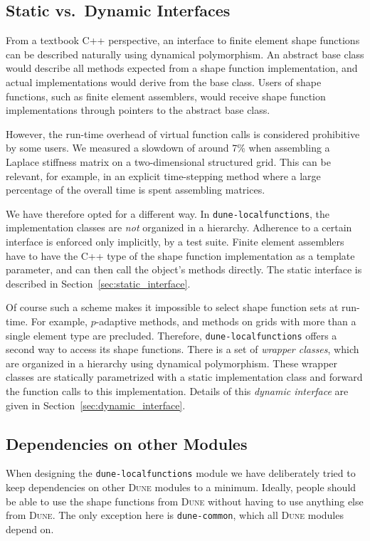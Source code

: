 \documentclass[11pt]{article}
\newcommand{\dune}{\textsc{Dune}\xspace}
\newcommand{\modulename}[1]{\texttt{#1}\xspace}
\begin{document}
\subsection{Static vs.\ Dynamic Interfaces}

From a textbook C++ perspective, an interface to finite element shape functions
can be described naturally using dynamical polymorphism.  An abstract base
class would describe all methods expected from a shape function implementation,
and actual implementations would derive from the base class.  Users of shape functions,
such as finite element assemblers, would receive shape function implementations
through pointers to the abstract base class.

However, the run-time overhead of virtual function calls is considered prohibitive
by some users.  We measured a slowdown of around 7\% when assembling a Laplace
stiffness matrix on a two-dimensional structured grid.  This can be relevant,
for example, in an explicit time-stepping method where a large percentage of
the overall time is spent assembling matrices.

We have therefore opted for a different way.  In \modulename{dune-localfunctions},
the implementation classes are {\em not} organized in a hierarchy.  Adherence
to a certain interface is enforced only implicitly, by a test suite.  Finite
element assemblers have to have the C++ type of the shape function implementation
as a template parameter, and can then call the object's methods directly.
The static interface is described in Section~\ref{sec:static_interface}.

Of course such a scheme makes it impossible to select shape function sets at run-time.
For example, $p$-adaptive methods, and methods on grids with more than a single
element type are precluded.  Therefore, \modulename{dune-localfunctions} offers
a second way to access its shape functions.  There is a set of {\em wrapper classes},
which are organized in a hierarchy using dynamical polymorphism.  These
wrapper classes are statically parametrized with a static implementation class
and forward the function calls to this implementation.  Details of this
{\em dynamic interface} are given in Section~\ref{sec:dynamic_interface}.

\subsection{Dependencies on other Modules}

When designing the \modulename{dune-localfunctions} module we have deliberately
tried to keep dependencies on other \dune modules to a minimum.  Ideally,
people should be able to use the shape functions from \dune without having
to use anything else from \dune.  The only exception here is \modulename{dune-common},
which all \dune modules depend on.
\end{document}

